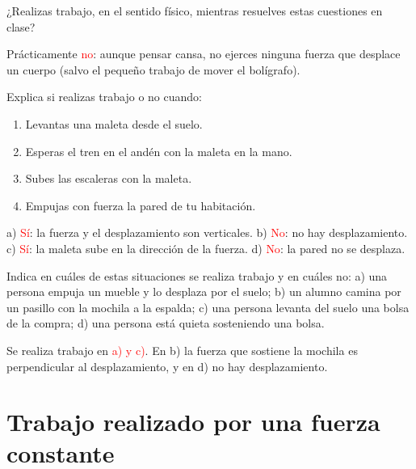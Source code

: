 \begin{exercise}
    ¿Realizas trabajo, en el sentido físico, mientras resuelves estas cuestiones en clase?
    \begin{solu}
        Prácticamente \textcolor{red}{no}: aunque pensar cansa, no ejerces ninguna fuerza que desplace un cuerpo (salvo el pequeño trabajo de mover el bolígrafo).
    \end{solu}
\end{exercise}

\begin{exercise}
    Explica si realizas trabajo o no cuando:
    \begin{enumerate}[label=\alph*)]
        \item Levantas una maleta desde el suelo.
        \item Esperas el tren en el andén con la maleta en la mano.
        \item Subes las escaleras con la maleta.
        \item Empujas con fuerza la pared de tu habitación.
    \end{enumerate}
    \begin{solu}
        a) \textcolor{red}{Sí}: la fuerza y el desplazamiento son verticales. b) \textcolor{red}{No}: no hay desplazamiento. c) \textcolor{red}{Sí}: la maleta sube en la dirección de la fuerza. d) \textcolor{red}{No}: la pared no se desplaza.
    \end{solu}
\end{exercise}

\begin{exercise}
    Indica en cuáles de estas situaciones se realiza trabajo y en cuáles no: a) una persona empuja un mueble y lo desplaza por el suelo; b) un alumno camina por un pasillo con la mochila a la espalda; c) una persona levanta del suelo una bolsa de la compra; d) una persona está quieta sosteniendo una bolsa.
    \begin{solu}
        Se realiza trabajo en \textcolor{red}{a) y c)}. En b) la fuerza que sostiene la mochila es perpendicular al desplazamiento, y en d) no hay desplazamiento.
    \end{solu}
\end{exercise}

\section{Trabajo realizado por una fuerza constante}

